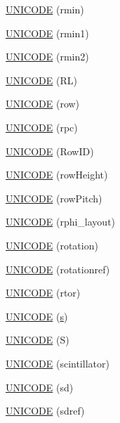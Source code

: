 \begin{DoxyCompactItemize}
\item 
\hyperlink{namespace_d_d4hep_1_1_x_m_l_ab5bfaefe5696b158b3d227c3797bbfb3}{UNICODE} (rmin)
\item 
\hyperlink{namespace_d_d4hep_1_1_x_m_l_a903f87e0f9c5a2ebc96a0289b4c917ec}{UNICODE} (rmin1)
\item 
\hyperlink{namespace_d_d4hep_1_1_x_m_l_a4e1b69cc598ccf7abcc8d544429c88d3}{UNICODE} (rmin2)
\item 
\hyperlink{namespace_d_d4hep_1_1_x_m_l_a7170517d8656521eef81bed4e7179632}{UNICODE} (RL)
\item 
\hyperlink{namespace_d_d4hep_1_1_x_m_l_aec4e3ad06e56bb18cb9ad2e67484d903}{UNICODE} (row)
\item 
\hyperlink{namespace_d_d4hep_1_1_x_m_l_a0f7e9a352ef00d699f4c80a5c839daaa}{UNICODE} (rpc)
\item 
\hyperlink{namespace_d_d4hep_1_1_x_m_l_a5bdac2ce9acc58f9e886b90ec6cea5bd}{UNICODE} (RowID)
\item 
\hyperlink{namespace_d_d4hep_1_1_x_m_l_a48a412668853f7fff376ebbaa5f98ba3}{UNICODE} (rowHeight)
\item 
\hyperlink{namespace_d_d4hep_1_1_x_m_l_a6f7d61e331d2c5b4f80950285dee03ad}{UNICODE} (rowPitch)
\item 
\hyperlink{namespace_d_d4hep_1_1_x_m_l_a9066e0dca5ccaa03b7e57e5eb1998f44}{UNICODE} (rphi\_\-layout)
\item 
\hyperlink{namespace_d_d4hep_1_1_x_m_l_a09a55b975545f86f8183aeff445d3d8c}{UNICODE} (rotation)
\item 
\hyperlink{namespace_d_d4hep_1_1_x_m_l_a057bf2de9416efe8d5153085fa33cd0b}{UNICODE} (rotationref)
\item 
\hyperlink{namespace_d_d4hep_1_1_x_m_l_a7fa90170666ca58dd54b29475b2df47f}{UNICODE} (rtor)
\item 
\hyperlink{namespace_d_d4hep_1_1_x_m_l_a41b5e423b23bee82d221f775c71df1fa}{UNICODE} (\hyperlink{_volumes_8cpp_a17ca6bfc8040d695d3cada22a4763d40}{s})
\item 
\hyperlink{namespace_d_d4hep_1_1_x_m_l_af94f56ce81ab972984228369edb75959}{UNICODE} (S)
\item 
\hyperlink{namespace_d_d4hep_1_1_x_m_l_a5f445b0b81e3d1c46398930e978810a9}{UNICODE} (scintillator)
\item 
\hyperlink{namespace_d_d4hep_1_1_x_m_l_a4dbc6a36c60f2b43aad7b1f06167d0d8}{UNICODE} (sd)
\item 
\hyperlink{namespace_d_d4hep_1_1_x_m_l_a3366ec5d00717a755b13913dd6ba9092}{UNICODE} (sdref)
\item 

\end{DoxyCompactItemize}
